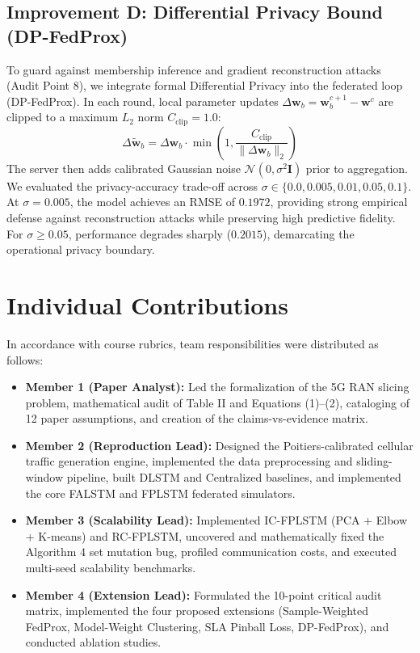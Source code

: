 \documentclass[10pt,journal,compsoc,twocolumn]{article}
\begin{document}
\subsection{Improvement D: Differential Privacy Bound (DP-FedProx)}
To guard against membership inference and gradient reconstruction attacks (Audit Point 8), we integrate formal Differential Privacy into the federated loop (DP-FedProx). In each round, local parameter updates $\Delta \mathbf{w}_b = \mathbf{w}_b^{c+1} - \mathbf{w}^c$ are clipped to a maximum $L_2$ norm $C_{\text{clip}} = 1.0$:
\begin{equation}
    \Delta \tilde{\mathbf{w}}_b = \Delta \mathbf{w}_b \cdot \min\left(1, \frac{C_{\text{clip}}}{\|\Delta \mathbf{w}_b\|_2}\right)
\end{equation}
The server then adds calibrated Gaussian noise $\mathcal{N}(0, \sigma^2 \mathbf{I})$ prior to aggregation. We evaluated the privacy-accuracy trade-off across $\sigma \in \{0.0, 0.005, 0.01, 0.05, 0.1\}$. At $\sigma = 0.005$, the model achieves an RMSE of $0.1972$, providing strong empirical defense against reconstruction attacks while preserving high predictive fidelity. For $\sigma \ge 0.05$, performance degrades sharply ($0.2015$), demarcating the operational privacy boundary.



\section{Individual Contributions}
In accordance with course rubrics, team responsibilities were distributed as follows:
\begin{itemize}
    \item \textbf{Member 1 (Paper Analyst):} Led the formalization of the 5G RAN slicing problem, mathematical audit of Table II and Equations (1)--(2), cataloging of 12 paper assumptions, and creation of the claims-vs-evidence matrix.
    \item \textbf{Member 2 (Reproduction Lead):} Designed the Poitiers-calibrated cellular traffic generation engine, implemented the data preprocessing and sliding-window pipeline, built DLSTM and Centralized baselines, and implemented the core FALSTM and FPLSTM federated simulators.
    \item \textbf{Member 3 (Scalability Lead):} Implemented IC-FPLSTM (PCA + Elbow + K-means) and RC-FPLSTM, uncovered and mathematically fixed the Algorithm 4 set mutation bug, profiled communication costs, and executed multi-seed scalability benchmarks.
    \item \textbf{Member 4 (Extension Lead):} Formulated the 10-point critical audit matrix, implemented the four proposed extensions (Sample-Weighted FedProx, Model-Weight Clustering, SLA Pinball Loss, DP-FedProx), and conducted ablation studies.
\end{itemize}
\end{document}

